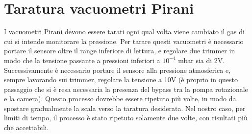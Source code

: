 \documentclass[11pt]{article}
\begin{document}
\section{Taratura vacuometri Pirani}
I vacuometri Pirani devono essere tarati ogni qual volta viene cambiato il gas di cui si intende monitorare la pressione. Per tarare questi vacuometri è necessario portare il sensore oltre il range inferiore di lettura, e regolare due trimmer in modo che la tensione passante a pressioni inferiori a $10^{-4}$ mbar sia di 2V. Successivamente è necessario portare il sensore alla pressione atmosferica e, sempre lavorando sui trimmer, regolare la tensione a 10V (è proprio in questo passaggio che si è resa necessaria la presenza del bypass tra la pompa rotazionale e la camera). Questo processo dovrebbe essere ripetuto più volte, in modo da spostare gradualmente la scala verso la taratura desiderata. Nel nostro caso, per limiti di tempo, il processo è stato ripetuto solamente due volte, con risultati più che accettabili.  
\end{document}
